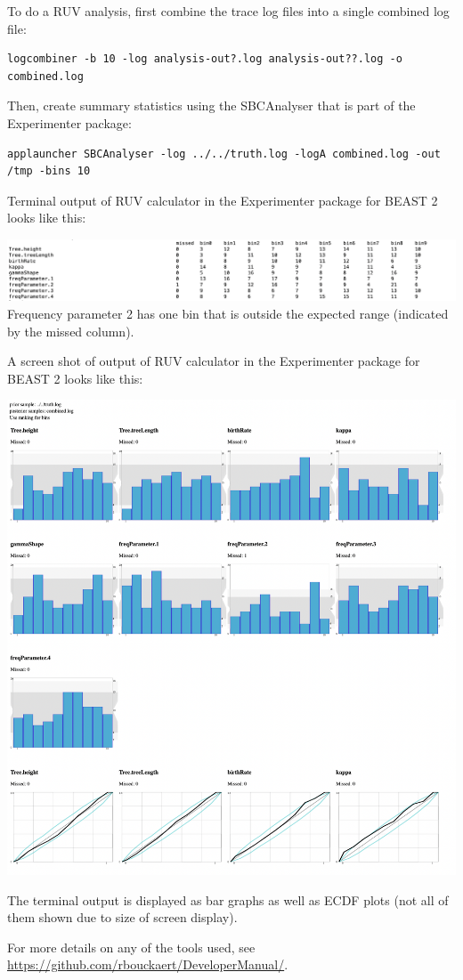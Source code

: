 \documentclass[oneside]{article}
\begin{document}
To do a RUV analysis, first combine the trace log files into a single combined log file:

{\scriptsize
\begin{lstlisting}
logcombiner -b 10 -log analysis-out?.log analysis-out??.log -o combined.log
\end{lstlisting}
}


Then, create summary statistics using the SBCAnalyser that is part of the Experimenter package:

{\scriptsize
\begin{lstlisting}
applauncher SBCAnalyser -log ../../truth.log -logA combined.log -out /tmp -bins 10
\end{lstlisting}
}


Terminal output of RUV calculator in the Experimenter package for BEAST 2 looks like this:

   \includegraphics[width=\textwidth]{../figures/sbscalculator0.png}
   {
   Frequency parameter 2 has one bin that is outside the expected range (indicated by the missed column).
   }

A screen shot of output of RUV calculator in the Experimenter package for BEAST 2 looks like this:

   \includegraphics[width=\textwidth]{../figures/sbscalculator.png}

   {
   The terminal output is displayed as bar graphs as well as ECDF plots (not all of them shown due to size of screen display).}
 

For more details on any of the tools used, see \url{https://github.com/rbouckaert/DeveloperManual/}.

\clearpage


\end{document}
